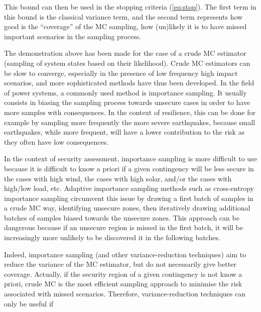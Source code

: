 
This bound can then be used in the stopping criteria (\ref{eq:stop}). The first term in this bound is the classical variance term, and the second term represents how good is the ``coverage'' of the MC sampling, \ie how (un)likely it is to have missed important scenarios in the sampling process.


The demonstration above has been made for the case of a crude MC estimator (\ie sampling of system states based on their likelihood). Crude MC estimators can be slow to converge, especially in the presence of low frequency high impact scenarios, and more sophisticated methods have thus been developed. In the field of power systems, a commonly used method is importance sampling. It usually consists in biasing the sampling process towards unsecure cases in order to have more samples with consequences. In the context of resilience, this can be done for example by sampling more frequently the more severe earthquakes, because small earthquakes, while more frequent, will have a lower contribution to the risk as they often have low consequences.

In the context of security assessment, importance sampling is more difficult to use because it is difficult to know a priori if a given contingency will be less secure in the cases with high wind, the cases with high solar, and/or the cases with high/low load, etc. Adaptive importance sampling methods such as cross-entropy importance sampling circumvent this issue by drawing a first batch of samples in a crude MC way, identifying unsecure zones, then iteratively drawing additional batches of samples biased towards the unsecure zones. This approach can be dangerous because if an unsecure region is missed in the first batch, it will be increasingly more unlikely to be discovered it in the following batches.

Indeed, importance sampling (and other variance-reduction techniques) aim to reduce the variance of the MC estimator, but do not necessarily give better coverage. Actually, if the security region of a given contingency is not know a priori, crude MC is the most efficient sampling approach to minimise the risk associated with missed scenarios. Therefore, variance-reduction techniques can only be useful if

